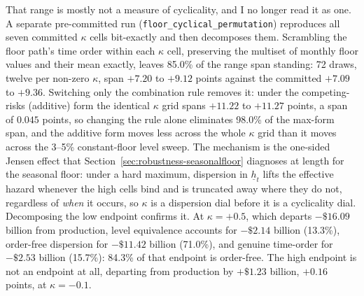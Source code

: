 \documentclass[12pt]{article}
\begin{document}
That range is mostly not a measure of cyclicality, and I no longer read it as one. A separate pre-committed run (\texttt{floor\_cyclical\_permutation}) reproduces all seven committed $\kappa$ cells bit-exactly and then decomposes them. Scrambling the floor path's time order within each $\kappa$ cell, preserving the multiset of monthly floor values and their mean exactly, leaves 85.0\% of the range span standing: 72 draws, twelve per non-zero $\kappa$, span $+7.20$ to $+9.12$ points against the committed $+7.09$ to $+9.36$. Switching only the combination rule removes it: under the competing-risks (additive) form the identical $\kappa$ grid spans $+11.22$ to $+11.27$ points, a span of $0.045$ points, so changing the rule alone eliminates 98.0\% of the max-form span, and the additive form moves less across the whole $\kappa$ grid than it moves across the 3--5\% constant-floor level sweep. The mechanism is the one-sided Jensen effect that Section~\ref{sec:robustness-seasonalfloor} diagnoses at length for the seasonal floor: under a hard maximum, dispersion in $\underline{h}_t$ lifts the effective hazard whenever the high cells bind and is truncated away where they do not, regardless of \emph{when} it occurs, so $\kappa$ is a dispersion dial before it is a cyclicality dial. Decomposing the low endpoint confirms it. At $\kappa = +0.5$, which departs $-\$16.09$ billion from production, level equivalence accounts for $-\$2.14$ billion (13.3\%), order-free dispersion for $-\$11.42$ billion (71.0\%), and genuine time-order for $-\$2.53$ billion (15.7\%): 84.3\% of that endpoint is order-free. The high endpoint is not an endpoint at all, departing from production by $+\$1.23$ billion, $+0.16$ points, at $\kappa = -0.1$.
\end{document}
